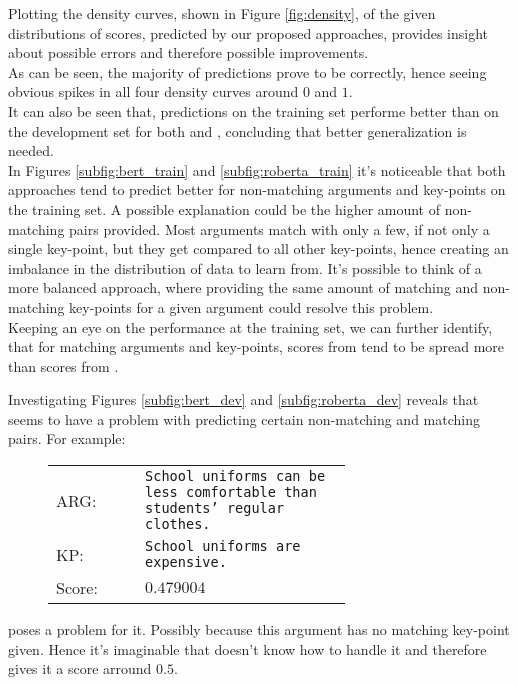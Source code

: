 Plotting the density curves, shown in Figure \ref{fig:density}, of the given distributions of scores, predicted by our proposed approaches, provides 
insight about possible errors and therefore possible improvements.\\
As can be seen, the majority of predictions prove to be correctly, hence seeing obvious spikes in all four density
curves around $0$ and $1$.\\
It can also be seen that, predictions on the training set performe better than on the development set for both 
\Roberta and \Bert, concluding that better generalization is needed.\\
In Figures \ref{subfig:bert_train} and \ref{subfig:roberta_train} it's noticeable that
both approaches tend to predict better for non-matching arguments and key-points on the training set. A possible explanation 
could be the higher amount of non-matching pairs provided. Most arguments match with only a few, if 
not only a single key-point, but they get compared to all other key-points, hence creating an imbalance in the distribution 
of data to learn from. It's possible to think of a more balanced approach, where providing the same amount of matching and 
non-matching key-points for a given argument could resolve this problem.\\
Keeping an eye on the performance at the training set, we can further identify, that for matching arguments and key-points, 
scores from \Bert tend to be spread more than scores from \Roberta.

Investigating Figures \ref{subfig:bert_dev} and \ref{subfig:roberta_dev} reveals that \Bert seems to have a problem with 
predicting certain non-matching and matching pairs. For example: \\

\begin{figure}[H]
    \begin{tabularx}{\linewidth}{lp{0.7\linewidth}}
            ARG: & \texttt{School uniforms can be less comfortable than students' regular clothes.}\\
            KP: & \texttt{School uniforms are expensive.}\\
            Score:& $0.479004$\\
    \end{tabularx}
\end{figure}

poses a problem for it. Possibly because this argument has no matching key-point given. Hence it's imaginable that 
\Bert doesn't know how to handle it and therefore gives it a score arround $0.5$.

